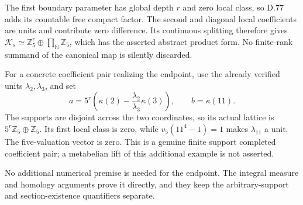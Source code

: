 The first boundary parameter has global depth \(r\) and
zero local class, so D.77 adds its countable free compact
factor. The second and diagonal local coefficients are units
and contribute zero difference. Its continuous splitting
therefore gives
\(\mathcal K_s\simeq\mathbb Z_5^r\oplus\prod_{\mathbb N}\mathbb Z_5\),
which has the asserted abstract product form. No finite-rank
summand of the canonical map is silently discarded.

For a concrete coefficient pair realizing the endpoint,
use the already verified units \(\lambda_2,\lambda_3\), and set
\[
 a=5^r\left(\kappa(2)-\frac{\lambda_2}{\lambda_3}\kappa(3)\right),
                       \qquad b=\kappa(11).              \tag{D94E.13}
\]
The supports are disjoint across the two coordinates, so its
actual lattice is \(5^r\mathbb Z_5\oplus\mathbb Z_5\).
Its first local class is zero, while
\(v_5(11^4-1)=1\) makes \(\lambda_{11}\) a unit.
The five-valuation vector is zero. This is a genuine finite
support completed coefficient pair; a metabelian lift of this
additional example is not asserted.

No additional numerical premise is needed for the endpoint.
The integral measure and homology arguments prove it directly,
and they keep the arbitrary-support and section-existence
quantifiers separate.

